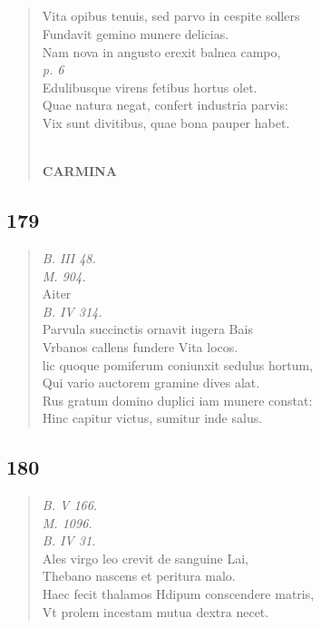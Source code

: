 \documentclass[11pt, a4paper]{report}
\begin{document}
            \subsection*{}
      \begin{verse}
      Vita opibus tenuis, sed parvo in cespite sollers \\ Fundavit gemino munere delicias. \\ Nam nova  \lbrack in \rbrack  angusto erexit balnea campo, \\ \textit{p. 6} \\ Edulibusque virens fetibus hortus olet. \\ Quae natura negat, confert industria parvis: \\ Vix sunt divitibus, quae bona pauper habet. \\ 
        ﻿\pagebreak 
     \marginpar{[154]} \begin{center} \textbf{CARMINA} \end{center}
      \end{verse}
  
            \subsection*{179}
      \begin{verse}
      \textit{B. III 48.} \\ \textit{M. 904.} \\ Aiter \\ \textit{B. IV 314.} \\ Parvula succinctis ornavit iugera Bais \\ Vrbanos callens fundere Vita locos. \\ lic quoque pomiferum coniunxit sedulus hortum, \\ Qui vario auctorem gramine dives alat. \\ Rus gratum domino duplici iam munere constat: \\ Hinc capitur victus, sumitur inde salus. \\ 
      \end{verse}
  
            \subsection*{180}
      \begin{verse}
      \textit{B. V 166.} \\ \textit{M. 1096.} \\ \textit{B. IV 31.} \\ Ales virgo leo crevit de sanguine Lai, \\ Thebano nascens et peritura malo. \\ Haec fecit thalamos Hdipum conscendere matris, \\ Vt prolem incestam mutua dextra necet. \\ 
      \end{verse}
  
\end{document}
